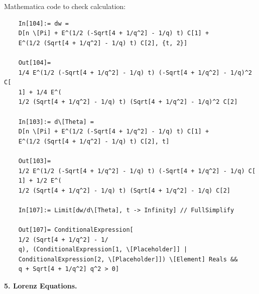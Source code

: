 \documentclass{article}
\theoremstyle{definition}
\begin{document}
\begin{enumerate}[label=(\alph*)]
	
	
	Mathematica code to check calculation:
	\begin{lstlisting}
	In[104]:= dw = 
	D[n \[Pi] + E^(1/2 (-Sqrt[4 + 1/q^2] - 1/q) t) C[1] + 
	E^(1/2 (Sqrt[4 + 1/q^2] - 1/q) t) C[2], {t, 2}]
	
	Out[104]= 
	1/4 E^(1/2 (-Sqrt[4 + 1/q^2] - 1/q) t) (-Sqrt[4 + 1/q^2] - 1/q)^2 C[
	1] + 1/4 E^(
	1/2 (Sqrt[4 + 1/q^2] - 1/q) t) (Sqrt[4 + 1/q^2] - 1/q)^2 C[2]
	
	In[103]:= d\[Theta] = 
	D[n \[Pi] + E^(1/2 (-Sqrt[4 + 1/q^2] - 1/q) t) C[1] + 
	E^(1/2 (Sqrt[4 + 1/q^2] - 1/q) t) C[2], t]
	
	Out[103]= 
	1/2 E^(1/2 (-Sqrt[4 + 1/q^2] - 1/q) t) (-Sqrt[4 + 1/q^2] - 1/q) C[
	1] + 1/2 E^(
	1/2 (Sqrt[4 + 1/q^2] - 1/q) t) (Sqrt[4 + 1/q^2] - 1/q) C[2]
	
	In[107]:= Limit[dw/d\[Theta], t -> Infinity] // FullSimplify
	
	Out[107]= ConditionalExpression[
	1/2 (Sqrt[4 + 1/q^2] - 1/
	q), (ConditionalExpression[1, \[Placeholder]] | 
	ConditionalExpression[2, \[Placeholder]]) \[Element] Reals && 
	q + Sqrt[4 + 1/q^2] q^2 > 0]
	\end{lstlisting}
	
\end{enumerate}

\noindent \textbf{5. Lorenz Equations.}
\end{document}
